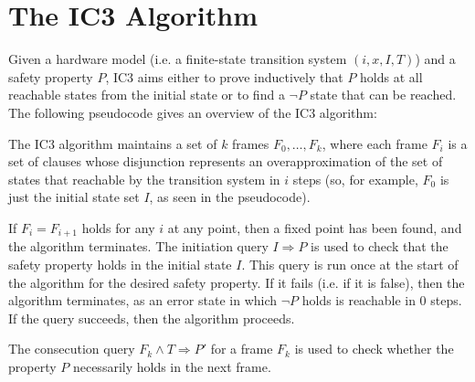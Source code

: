 \documentclass[12pt,a4paper,twoside,openright]{report}
\begin{document}
{\section{The IC3 Algorithm}
Given a hardware model (i.e. a finite-state transition system $(i,x,I,T)$) and a
safety property $P$, IC3 aims either to prove inductively that $P$ holds
at all reachable states from the initial state or
to find a $\neg P$ state that can be reached.
The following pseudocode gives an overview of the IC3 algorithm:

\begin{algorithm}[H]
\DontPrintSemicolon
{}
\end{algorithm}

The IC3 algorithm maintains a set of $k$ frames $F_0,\ldots,F_k$, where
each frame $F_i$ is a set of clauses whose disjunction represents an
overapproximation of the set of states that reachable by the transition
system in $i$ steps
(so, for example, $F_0$ is just the initial state set $I$, as seen
in the pseudocode).

If $F_i = F_{i + 1}$ holds for any $i$ at any point, then a fixed point has
been found, and the algorithm terminates.
The initiation query $I \Rightarrow P$ is used to check that the safety
property holds in the initial state $I$.
This query is run once at the start of
the algorithm for the desired safety property. If it fails (i.e. if it
is false), then the algorithm terminates, as an error state in
which $\neg P$ holds is reachable in 0 steps. If the query succeeds,
then the algorithm proceeds.

The consecution query $F_k \wedge T \Rightarrow P'$ for a frame $F_k$
is used to check whether the property $P$ necessarily holds in the next
frame.

}
\end{document}
